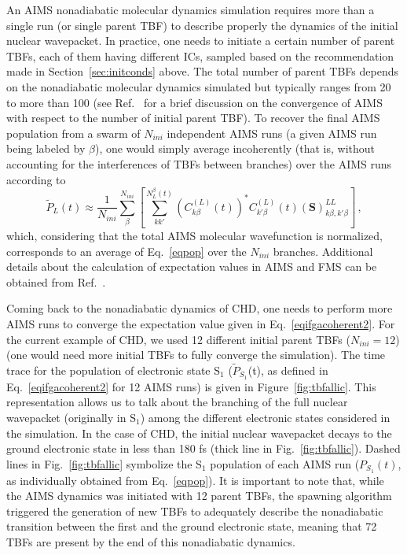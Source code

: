 \documentclass[9pt,bestpractices,pubversion]{livecoms}
\newcommand{\bs}{\mathbf}
\begin{document}
An AIMS nonadiabatic molecular dynamics simulation requires more than a single run (or single parent TBF) to describe properly the dynamics of the initial nuclear wavepacket. In practice, one needs to initiate a certain number of parent TBFs, each of them having different ICs, sampled based on the recommendation made in Section~\ref{sec:initconds} above. The total number of parent TBFs depends on the nonadiabatic molecular dynamics simulated but typically ranges from 20 to more than 100 (see Ref.~ for a brief discussion on the convergence of AIMS with respect to the number of initial parent TBF). To recover the final AIMS population from a swarm of $N_{ini}$ independent AIMS runs (a given AIMS run being labeled by $\beta$), one would simply average incoherently (that is, without accounting for the interferences of TBFs between branches) over the AIMS runs according to
\begin{equation}
\tilde{P}_L(t) \approx \frac{1}{N_{ini}} \sum_{\beta}^{N_{ini}} \left[   \sum_{kk'}^{N_L^\beta(t)} \left(C_{k\beta}^{(L)}(t)\right)^\ast C_{k'\beta}^{(L)}(t)  (\bs S)^{LL}_{k\beta,k'\beta} \right] \, ,
\label{eqifgacoherent2}
\end{equation}
which, considering that the total AIMS molecular wavefunction is normalized, corresponds to an average of Eq.~\eqref{eqpop} over the $N_{ini}$ branches.
Additional details about the calculation of expectation values in AIMS and FMS can be obtained from Ref.~.

Coming back to the nonadiabatic dynamics of CHD, one needs to perform more AIMS runs to converge the expectation value given in Eq.~\eqref{eqifgacoherent2}. For the current example of CHD, we used 12 different initial parent TBFs ($N_{ini}=12$) (one would need more initial TBFs to fully converge the simulation). The time trace for the population of electronic state S$_1$ ($\tilde{P}_{S_1}$(t), as defined in Eq.~\eqref{eqifgacoherent2} for 12 AIMS runs) is given in Figure~\ref{fig:tbfallic}. This representation allows us to talk about the branching of the full nuclear wavepacket (originally in S$_1$) among the different electronic states considered in the simulation. In the case of CHD, the initial nuclear wavepacket decays to the ground electronic state in less than 180 fs (thick line in Fig.~\ref{fig:tbfallic}). Dashed lines in Fig.~\ref{fig:tbfallic} symbolize the S$_1$ population of each AIMS run ($P_{S_1}(t)$, as individually obtained from Eq.~\eqref{eqpop}). It is important to note that, while the AIMS dynamics was initiated with 12 parent TBFs, the spawning algorithm triggered the generation of new TBFs to adequately describe the nonadiabatic transition between the first and the ground electronic state, meaning that 72 TBFs are present by the end of this nonadiabatic dynamics. 
\end{document}
